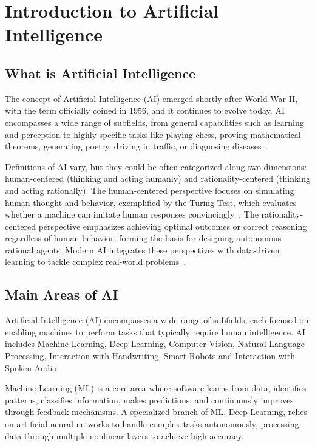 \chapter{Introduction to Artificial Intelligence}

\section{What is Artificial Intelligence}

The concept of Artificial Intelligence (AI) emerged shortly after World War II, with the term officially coined in 1956, and it continues to evolve today. AI encompasses a wide range of subfields, from general capabilities such as learning and perception to highly specific tasks like playing chess, proving mathematical theorems, generating poetry, driving in traffic, or diagnosing diseases~\parencite{RussellNorvig2010}. 

Definitions of AI vary, but they could be often categorized along two dimensions: human-centered (thinking and acting humanly) and rationality-centered (thinking and acting rationally). The human-centered perspective focuses on simulating human thought and behavior, exemplified by the Turing Test, which evaluates whether a machine can imitate human responses convincingly~\parencite{Turing1950}. The rationality-centered perspective emphasizes achieving optimal outcomes or correct reasoning regardless of human behavior, forming the basis for designing autonomous rational agents. Modern AI integrates these perspectives with data-driven learning to tackle complex real-world problems~\parencite{RussellNorvig2010}.

\section{Main Areas of AI}

Artificial Intelligence (AI) encompasses a wide range of subfields, each focused on enabling machines to perform tasks that typically require human intelligence. AI includes Machine Learning, Deep Learning, Computer Vision, Natural Language Processing, Interaction with Handwriting, Smart Robots and Interaction with Spoken Audio.

Machine Learning (ML) is a core area where software learns from data, identifies patterns, classifies information, makes predictions, and continuously improves through feedback mechanisms. A specialized branch of ML, Deep Learning, relies on artificial neural networks to handle complex tasks autonomously, processing data through multiple nonlinear layers to achieve high accuracy.

